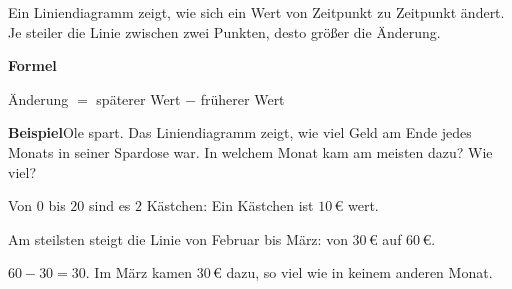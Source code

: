 \documentclass[11pt]{article}
\makeatletter
\newlength{\kr}
\newcommand{\karomerk}[2]{\protected@write\@auxout{}{\string\karoseite{#1}{#2}{\thepage}}}
\newcommand{\karoseite}[3]{\expandafter\xdef\csname karo@#1@#2\endcsname{#3}}
\makeatother
\begin{document}
\medskip
\par\vspace{3mm}\setlength{\kr}{\dimexpr\pagegoal-\pagetotal-10mm\relax}%
\ifdim\kr>12mm\karomerk{k}{B}\noindent{\scriptsize\color{mbgrau}Platz zum Rechnen}\par\nointerlineskip\vspace{1mm}\noindent
\begin{tikzpicture}\clip (0,0) rectangle ({\linewidth-0.5mm},\kr);\draw[black!16,line width=0.3pt,step=5mm] (0,0) grid (\linewidth,\kr);\end{tikzpicture}\fi\par
\clearpage\label{s:C}\noindent\colorbox{black!12}{}\hspace{3mm}{\Large\bfseries Liniendiagramme lesen}\par\smallskip
\noindent Ein Liniendiagramm zeigt, wie sich ein Wert von Zeitpunkt zu Zeitpunkt ändert. Je steiler die Linie zwischen zwei Punkten, desto größer die Änderung.\par\medskip
\noindent\textbf{Formel}\par\nopagebreak\noindent\hspace*{4mm}\begin{minipage}{\dimexpr\linewidth-4mm\relax}Änderung $=$ späterer Wert $-$ früherer Wert \end{minipage}\par\medskip
\noindent\textbf{Beispiel}\quad Ole spart. Das Liniendiagramm zeigt, wie viel Geld am Ende jedes Monats in seiner Spardose war. In welchem Monat kam am meisten dazu? Wie viel?\par\smallskip
\noindent\begin{minipage}[t]{0.6\linewidth}\vspace{0pt}\par\noindent{}Von $0$ bis $20$ sind es $2$ Kästchen: Ein Kästchen ist $10$\,€ wert.\par\smallskip\par\noindent{}Am steilsten steigt die Linie von Februar bis März: von $30$\,€ auf $60$\,€.\par\smallskip\par\noindent{}$60 - 30 = 30$. Im März kamen $30$\,€ dazu, so viel wie in keinem anderen Monat.\par\smallskip\end{minipage}\hfill
\end{document}
